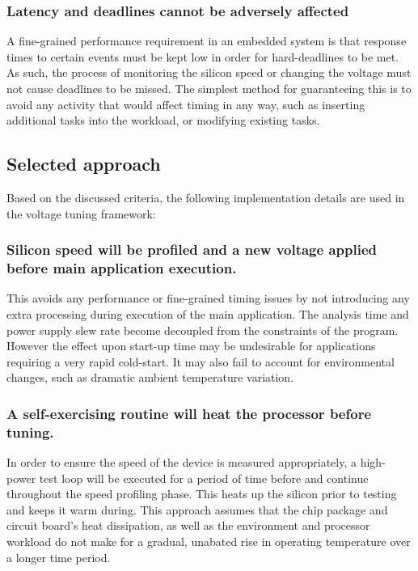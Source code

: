 \documentclass[a4paper,twocolumn,DIV=16]{scrartcl}
\begin{document}
\subsubsection*{Latency and deadlines cannot be adversely affected}

A fine-grained performance requirement in an embedded system is that response
times to certain events must be kept low in order for hard-deadlines to be met.
As such, the process of monitoring the silicon speed or changing the voltage
must not cause deadlines to be missed. The simplest method for guaranteeing this
is to avoid any activity that would affect timing in any way, such as inserting
additional tasks into the workload, or modifying existing tasks.

\subsection{Selected approach}

Based on the discussed criteria, the following implementation details are used
in the voltage tuning framework:

\subsubsection*{Silicon speed will be profiled and a new voltage applied before
main application execution.}

This avoids any performance or fine-grained timing issues by not introducing any
extra processing during execution of the main application. The analysis time and
power supply slew rate become decoupled from the constraints of the program.
However the effect upon start-up time may be undesirable for applications
requiring a very rapid cold-start. It may also fail to account for environmental
changes, such as dramatic ambient temperature variation.

\subsubsection*{A self-exercising routine will heat the processor before
tuning.}

In order to ensure the speed of the device is measured appropriately, a
high-power test loop will be executed for a period of time before and continue
throughout the speed profiling phase. This heats up the silicon prior to testing
and keeps it warm during. This approach assumes that the chip package and
circuit board's heat dissipation, as well as the environment and processor
workload do not make for a gradual, unabated rise in operating temperature over
a longer time period.
\end{document}
